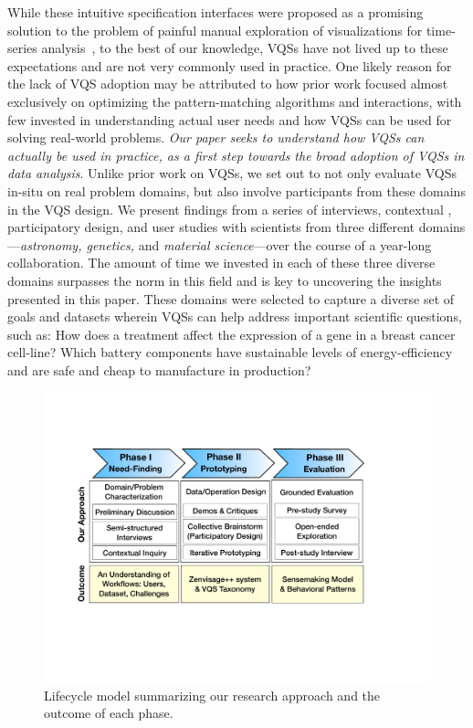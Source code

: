  \par While these intuitive specification interfaces were proposed as a promising solution to the problem of painful manual exploration of visualizations for time-series analysis~\cite{ryall2005querylines,wattenberg2001sketching}, to the best of our knowledge, VQSs have not lived up to these expectations and are not very commonly used in practice. One likely reason for the lack of VQS adoption may be attributed to how prior work  focused almost exclusively on optimizing the pattern-matching algorithms and interactions, with few invested in understanding actual user needs and how VQSs can be used for solving real-world problems. {\em Our paper seeks to understand how VQSs can actually be used in practice, as a first step towards the broad adoption of VQSs in data analysis}. Unlike prior work on VQSs, we set out to not only evaluate VQSs in-situ on real problem domains, but also involve participants from these domains in the VQS design. We present findings from a series of interviews, contextual , participatory design, and user studies with scientists from three different domains---{\em astronomy, genetics,} and {\em material science}---over the course of a year-long collaboration. The amount of time we invested in each of these three diverse domains surpasses the norm in this field and is key to uncovering the insights presented in this paper. These domains were selected to capture a diverse set of goals and datasets wherein VQSs can help address important scientific questions, such as: How does a treatment affect the expression of a gene in a breast cancer cell-line? Which battery components have sustainable levels of energy-efficiency and are safe and cheap to manufacture in production?
 \begin{figure}
    \centering
    \includegraphics[width=0.85\linewidth]{figures/methodFlowchart.pdf}
    \caption{Lifecycle model summarizing our research approach and the outcome of each phase.}
    \label{methodFlowchart}
    \vspace*{-20pt}
  \end{figure}
